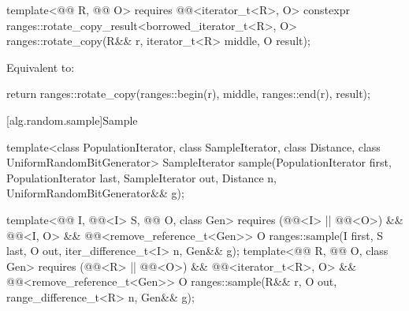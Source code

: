 \begin{itemdecl}
template<@@ R, @@ O>
  requires @@<iterator_t<R>, O>
  constexpr ranges::rotate_copy_result<borrowed_iterator_t<R>, O>
    ranges::rotate_copy(R&& r, iterator_t<R> middle, O result);
\end{itemdecl}

\begin{itemdescr}
\pnum
\effects
Equivalent to:
\begin{codeblock}
return ranges::rotate_copy(ranges::begin(r), middle, ranges::end(r), result);
\end{codeblock}
\end{itemdescr}

[alg.random.sample]{Sample}

%
\begin{itemdecl}
template<class PopulationIterator, class SampleIterator,
         class Distance, class UniformRandomBitGenerator>
  SampleIterator sample(PopulationIterator first, PopulationIterator last,
                        SampleIterator out, Distance n,
                        UniformRandomBitGenerator&& g);

template<@@ I, @@<I> S, @@ O, class Gen>
  requires (@@<I> || @@<O>) &&
           @@<I, O> &&
           @@<remove_reference_t<Gen>>
  O ranges::sample(I first, S last, O out, iter_difference_t<I> n, Gen&& g);
template<@@ R, @@ O, class Gen>
  requires (@@<R> || @@<O>) &&
           @@<iterator_t<R>, O> &&
           @@<remove_reference_t<Gen>>
  O ranges::sample(R&& r, O out, range_difference_t<R> n, Gen&& g);
\end{itemdecl}

